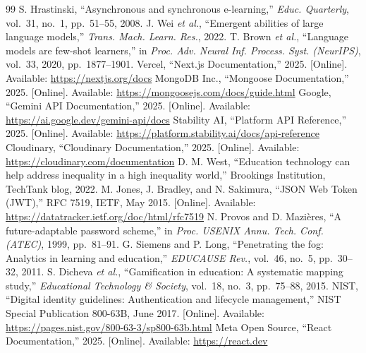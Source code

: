 \documentclass[conference]{IEEEtran}
\begin{document}

\clearpage
\begin{strip}
\begin{thebibliography}{99}
 S. Hrastinski, ``Asynchronous and synchronous e-learning,'' \textit{Educ. Quarterly}, vol.~31, no.~1, pp.~51--55, 2008.
 J. Wei \textit{et al.}, ``Emergent abilities of large language models,'' \textit{Trans. Mach. Learn. Res.}, 2022.
 T. Brown \textit{et al.}, ``Language models are few-shot learners,'' in \textit{Proc. Adv. Neural Inf. Process. Syst. (NeurIPS)}, vol.~33, 2020, pp.~1877--1901.
 Vercel, ``Next.js Documentation,'' 2025. [Online]. Available: \url{https://nextjs.org/docs}
 MongoDB Inc., ``Mongoose Documentation,'' 2025. [Online]. Available: \url{https://mongoosejs.com/docs/guide.html}
 Google, ``Gemini API Documentation,'' 2025. [Online]. Available: \url{https://ai.google.dev/gemini-api/docs}
 Stability AI, ``Platform API Reference,'' 2025. [Online]. Available: \url{https://platform.stability.ai/docs/api-reference}
 Cloudinary, ``Cloudinary Documentation,'' 2025. [Online]. Available: \url{https://cloudinary.com/documentation}
 D. M. West, ``Education technology can help address inequality in a high inequality world,'' Brookings Institution, TechTank blog, 2022.
 M. Jones, J. Bradley, and N. Sakimura, ``JSON Web Token (JWT),'' RFC 7519, IETF, May 2015. [Online]. Available: \url{https://datatracker.ietf.org/doc/html/rfc7519}
 N. Provos and D. Mazi\`{e}res, ``A future-adaptable password scheme,'' in \textit{Proc. USENIX Annu. Tech. Conf. (ATEC)}, 1999, pp.~81--91.
 G. Siemens and P. Long, ``Penetrating the fog: Analytics in learning and education,'' \textit{EDUCAUSE Rev.}, vol.~46, no.~5, pp.~30--32, 2011.
 S. Dicheva \textit{et al.}, ``Gamification in education: A systematic mapping study,'' \textit{Educational Technology \& Society}, vol.~18, no.~3, pp.~75--88, 2015.
 NIST, ``Digital identity guidelines: Authentication and lifecycle management,'' NIST Special Publication 800-63B, June 2017. [Online]. Available: \url{https://pages.nist.gov/800-63-3/sp800-63b.html}
 Meta Open Source, ``React Documentation,'' 2025. [Online]. Available: \url{https://react.dev}
\end{thebibliography}
\end{strip}
\end{document}

